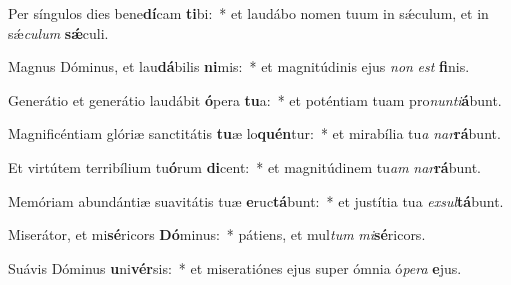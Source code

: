 \item Per síngulos dies bene\textbf{dí}cam \textbf{ti}bi:~* et laudábo nomen tuum in sǽculum, et in sǽ\textit{cu}\textit{lum} \textbf{sǽ}culi.
\item Magnus Dóminus, et lau\textbf{dá}bilis \textbf{ni}mis:~* et magnitúdinis ejus \textit{non} \textit{est} \textbf{fi}nis.
\item Generátio et generátio laudábit \textbf{ó}pera \textbf{tu}a:~* et poténtiam tuam pro\textit{nun}\textit{ti}\textbf{á}bunt.
\item Magnificéntiam glóriæ sanctitátis \textbf{tu}æ lo\textbf{quén}tur:~* et mirabília tu\textit{a} \textit{nar}\textbf{rá}bunt.
\item Et virtútem terribílium tu\textbf{ó}rum \textbf{di}cent:~* et magnitúdinem tu\textit{am} \textit{nar}\textbf{rá}bunt.
\item Memóriam abundántiæ suavitátis tuæ \textbf{e}ruc\textbf{tá}bunt:~* et justítia tua \textit{ex}\textit{sul}\textbf{tá}bunt.
\item Miserátor, et mi\textbf{sé}ricors \textbf{Dó}minus:~* pátiens, et mul\textit{tum} \textit{mi}\textbf{sé}ricors.
\item Suávis Dóminus \textbf{u}ni\textbf{vér}sis:~* et miseratiónes ejus super ómnia ó\textit{pe}\textit{ra} \textbf{e}jus.
